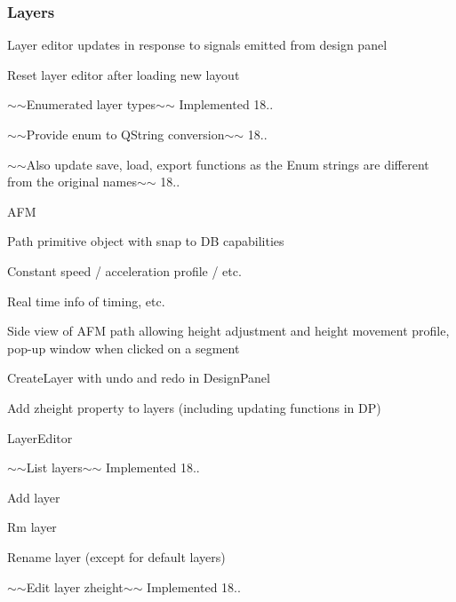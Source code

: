 \subsubsection*{Layers}


\begin{DoxyItemize}
\item Layer editor updates in response to signals emitted from design panel
\begin{DoxyItemize}
\item Reset layer editor after loading new layout
\end{DoxyItemize}
\item $\sim$$\sim$\+Enumerated layer types$\sim$$\sim$ Implemented 18..
\begin{DoxyItemize}
\item $\sim$$\sim$\+Provide enum to Q\+String conversion$\sim$$\sim$ 18..
\item $\sim$$\sim$\+Also update save, load, export functions as the Enum strings are different from the original names$\sim$$\sim$ 18..
\end{DoxyItemize}
\item A\+FM
\begin{DoxyItemize}
\item Path primitive object with snap to DB capabilities
\item Constant speed / acceleration profile / etc.
\begin{DoxyItemize}
\item Real time info of timing, etc.
\end{DoxyItemize}
\item Side view of A\+FM path allowing height adjustment and height movement profile, pop-\/up window when clicked on a segment
\end{DoxyItemize}
\item Create\+Layer with undo and redo in Design\+Panel
\item Add zheight property to layers (including updating functions in DP)
\item Layer\+Editor
\begin{DoxyItemize}
\item $\sim$$\sim$\+List layers$\sim$$\sim$ Implemented 18..
\item Add layer
\item Rm layer
\item Rename layer (except for default layers)
\item $\sim$$\sim$\+Edit layer zheight$\sim$$\sim$ Implemented 18..

\end{DoxyItemize}
\end{DoxyItemize}
